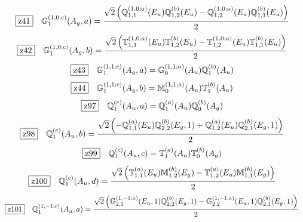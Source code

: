 \documentclass[fleqn,10pt,landscape]{jsarticle}
\begin{document}
\begin{dmath*}
\hspace*{3mm}\fbox{z41}\quad \mathbb{G}_{1}^{(1,0;c)}(A_{g},a)=\frac{\sqrt{2} \left(\mathbb{Q}_{1,1}^{(1,0;a)}(E_{u}) \mathbb{Q}_{1,2}^{(b)}(E_{u}) - \mathbb{Q}_{1,2}^{(1,0;a)}(E_{u}) \mathbb{Q}_{1,1}^{(b)}(E_{u})\right)}{2}
\end{dmath*}
\begin{dmath*}
\hspace*{3mm}\fbox{z42}\quad \mathbb{G}_{1}^{(1,0;c)}(A_{g},b)=\frac{\sqrt{2} \left(\mathbb{T}_{1,1}^{(1,0;a)}(E_{u}) \mathbb{T}_{1,2}^{(b)}(E_{u}) - \mathbb{T}_{1,2}^{(1,0;a)}(E_{u}) \mathbb{T}_{1,1}^{(b)}(E_{u})\right)}{2}
\end{dmath*}
\begin{dmath*}
\hspace*{3mm}\fbox{z43}\quad \mathbb{G}_{1}^{(1,1;c)}(A_{g},a)=\mathbb{G}_{0}^{(1,1;a)}(A_{u}) \mathbb{Q}_{1}^{(b)}(A_{u})
\end{dmath*}
\begin{dmath*}
\hspace*{3mm}\fbox{z44}\quad \mathbb{G}_{1}^{(1,1;c)}(A_{g},b)=\mathbb{M}_{0}^{(1,1;a)}(A_{u}) \mathbb{T}_{1}^{(b)}(A_{u})
\end{dmath*}
\begin{dmath*}
\hspace*{3mm}\fbox{z97}\quad \mathbb{Q}_{1}^{(c)}(A_{u},a)=\mathbb{Q}_{1}^{(a)}(A_{u}) \mathbb{Q}_{0}^{(b)}(A_{g})
\end{dmath*}
\begin{dmath*}
\hspace*{3mm}\fbox{z98}\quad \mathbb{Q}_{1}^{(c)}(A_{u},b)=\frac{\sqrt{2} \left(- \mathbb{Q}_{1,1}^{(a)}(E_{u}) \mathbb{Q}_{2,2}^{(b)}(E_{g},1) + \mathbb{Q}_{1,2}^{(a)}(E_{u}) \mathbb{Q}_{2,1}^{(b)}(E_{g},1)\right)}{2}
\end{dmath*}
\begin{dmath*}
\hspace*{3mm}\fbox{z99}\quad \mathbb{Q}_{1}^{(c)}(A_{u},c)=\mathbb{T}_{1}^{(a)}(A_{u}) \mathbb{T}_{0}^{(b)}(A_{g})
\end{dmath*}
\begin{dmath*}
\hspace*{3mm}\fbox{z100}\quad \mathbb{Q}_{1}^{(c)}(A_{u},d)=\frac{\sqrt{2} \left(\mathbb{T}_{1,1}^{(a)}(E_{u}) \mathbb{M}_{1,2}^{(b)}(E_{g}) - \mathbb{T}_{1,2}^{(a)}(E_{u}) \mathbb{M}_{1,1}^{(b)}(E_{g})\right)}{2}
\end{dmath*}
\begin{dmath*}
\hspace*{3mm}\fbox{z101}\quad \mathbb{Q}_{1}^{(1,-1;c)}(A_{u},a)=\frac{\sqrt{2} \left(\mathbb{G}_{2,1}^{(1,-1;a)}(E_{u},1) \mathbb{Q}_{2,2}^{(b)}(E_{g},1) - \mathbb{G}_{2,2}^{(1,-1;a)}(E_{u},1) \mathbb{Q}_{2,1}^{(b)}(E_{g},1)\right)}{2}
\end{dmath*}
\end{document}
